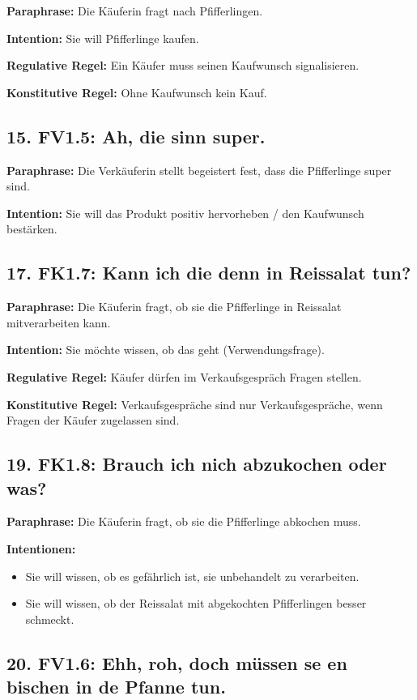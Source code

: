 \documentclass[11pt]{article}
\begin{document}
\textbf{Paraphrase:} Die Käuferin fragt nach Pfifferlingen.

\textbf{Intention:} Sie will Pfifferlinge kaufen.

\textbf{Regulative Regel:} Ein Käufer muss seinen Kaufwunsch signalisieren.

\textbf{Konstitutive Regel:} Ohne Kaufwunsch kein Kauf.

\subsection*{15. FV1.5: Ah, die sinn super.}

\textbf{Paraphrase:} Die Verkäuferin stellt begeistert fest, dass die Pfifferlinge super sind.

\textbf{Intention:} Sie will das Produkt positiv hervorheben / den Kaufwunsch bestärken.

\subsection*{17. FK1.7: Kann ich die denn in Reissalat tun?}

\textbf{Paraphrase:} Die Käuferin fragt, ob sie die Pfifferlinge in Reissalat mitverarbeiten kann.

\textbf{Intention:} Sie möchte wissen, ob das geht (Verwendungsfrage).

\textbf{Regulative Regel:} Käufer dürfen im Verkaufsgespräch Fragen stellen.

\textbf{Konstitutive Regel:} Verkaufsgespräche sind nur Verkaufsgespräche, wenn Fragen der Käufer zugelassen sind.

\subsection*{19. FK1.8: Brauch ich nich abzukochen oder was?}

\textbf{Paraphrase:} Die Käuferin fragt, ob sie die Pfifferlinge abkochen muss.

\textbf{Intentionen:}
\begin{itemize}
    \item Sie will wissen, ob es gefährlich ist, sie unbehandelt zu verarbeiten.
    \item Sie will wissen, ob der Reissalat mit abgekochten Pfifferlingen besser schmeckt.
\end{itemize}

\subsection*{20. FV1.6: Ehh, roh, doch müssen se en bischen in de Pfanne tun.}
\end{document}
